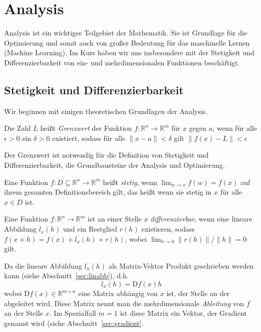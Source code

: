 \section{Analysis}

Analysis ist ein wichtiges Teilgebiet der Mathematik. Sie ist Grundlage für die Optimierung und somit auch von großer Bedeutung für das maschinelle Lernen (Machine Learning). Im Kurs haben wir uns insbesondere mit der Stetigkeit und Differenzierbarkeit von ein- und mehrdimensionalen Funktionen besch\"aftigt.

\subsection{Stetigkeit und Differenzierbarkeit}

Wir beginnen mit einigen theoretischen Grundlagen der Analysis.
\begin{Def} Die Zahl $L$ heißt \emph{Grenzwert} der Funktion $f:\mathbb{R}^n \to \mathbb{R}^m$ für $x$ gegen $a$, wenn für alle $\epsilon > 0$ ein $\delta > 0$ existiert, sodass für alle $\|x-a\| < \delta$ gilt $\|f(x)-L\|<\epsilon$
\end{Def}

Der Grenzwert ist notwendig f\"ur die Definition von Stetigkeit und Differenzierbarkeit, die Grundbausteine der Analysis und Optimierung. 
\begin{Def}
Eine Funktion $f: D \subseteq \mathbb{R}^n\rightarrow \mathbb{R}^m$ hei\ss t \emph{stetig}, wenn $\lim_{w\rightarrow x}f(w)=f(x)$ auf ihrem gesamten Definitionsbereich gilt, das heißt wenn sie stetig in $x$ für alle $x\in D$ ist.
\end{Def}
\begin{Def}
\label{def:diffbar}
Eine Funktion $f:\mathbb{R}^n\rightarrow \mathbb{R}^m$ ist an einer Stelle $x$ \emph{differenzierbar}, wenn eine lineare Abbildung $ l_ x (h)$ und ein Restglied $r(h)$ existieren, sodass $f(x+h)=f(x)+l_{x}(h)+r(h)$, wobei $\lim_{h\rightarrow 0} \|r(h)\|/\|h\|= 0$ gilt.
\end{Def}

Da die lineare Abbildung $l_x(h)$ als Matrix-Vektor Produkt geschrieben werden kann (siehe Abschnitt~\ref{sec:linabb}), d.h.
\begin{equation*}
l_x(h) = \text{D} f(x) h
\end{equation*}
wobei $\text{D} f(x) \in \mathbb{R}^{m \times n}$ eine Matrix abh\"angig von $x$ ist, der Stelle an der abgeleitet wird. Diese Matrix nennt man die mehrdimensionale \emph{Ableitung} von $f$ an der Stelle $x$.  Im Spezialfall $m=1$ ist diese Matrix ein Vektor, der Gradient genannt wird (siehe Abschnitt~\ref{sec:gradient}.

